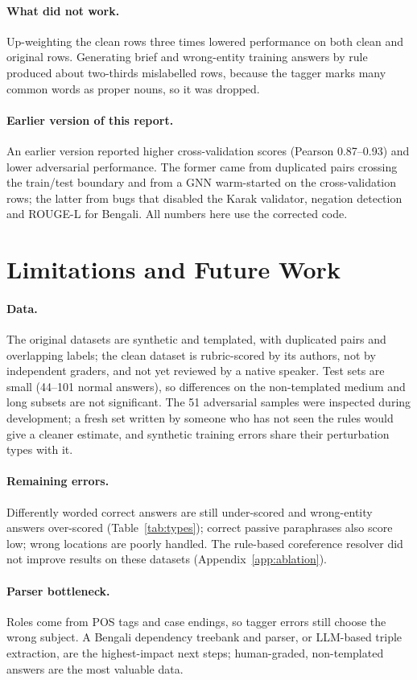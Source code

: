 \documentclass[10pt,a4paper,twocolumn]{article}
\begin{document}
\paragraph{What did not work.}
Up-weighting the clean rows three times lowered performance on both clean and
original rows. Generating brief and wrong-entity training answers by rule
produced about two-thirds mislabelled rows, because the tagger marks many
common words as proper nouns, so it was dropped.

\paragraph{Earlier version of this report.}
An earlier version reported higher cross-validation scores (Pearson 0.87--0.93)
and lower adversarial performance. The former came from duplicated pairs
crossing the train/test boundary and from a GNN warm-started on the
cross-validation rows; the latter from bugs that disabled the Karak validator,
negation detection and ROUGE-L for Bengali. All numbers here use the
corrected code.

\section{Limitations and Future Work}
\paragraph{Data.} The original datasets are synthetic and templated, with
duplicated pairs and overlapping labels; the clean dataset is rubric-scored by
its authors, not by independent graders, and not yet reviewed by a native
speaker. Test sets are small (44--101 normal answers), so differences on the
non-templated medium and long subsets are not significant. The 51 adversarial
samples were inspected during development; a fresh set written by someone
who has not seen the rules would give a cleaner estimate, and synthetic
training errors share their perturbation types with it.
\paragraph{Remaining errors.} Differently worded correct answers are still
under-scored and wrong-entity answers over-scored (Table~\ref{tab:types});
correct passive paraphrases also score low; wrong locations are poorly
handled. The rule-based coreference resolver did not improve results on
these datasets (Appendix~\ref{app:ablation}).
\paragraph{Parser bottleneck.} Roles come from POS tags and case endings, so
tagger errors still choose the wrong subject. A Bengali dependency treebank
and parser, or LLM-based triple extraction, are the highest-impact next
steps; human-graded, non-templated answers are the most valuable data.
\end{document}
